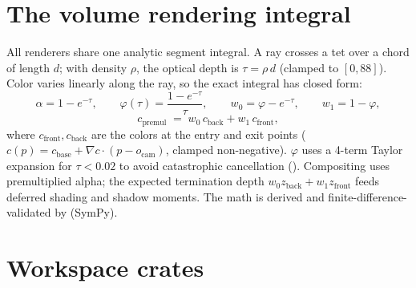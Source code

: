 \section{The volume rendering integral}

All renderers share one analytic segment integral. A ray crosses a tet over a
chord of length $d$; with density $\rho$, the optical depth is
$\tau = \rho\, d$ (clamped to $[0, 88]$). Color varies linearly along the
ray, so the exact integral has closed form:
\[
  \alpha = 1 - e^{-\tau}, \qquad
  \varphi(\tau) = \frac{1 - e^{-\tau}}{\tau}, \qquad
  w_0 = \varphi - e^{-\tau}, \qquad
  w_1 = 1 - \varphi,
\]
\[
  c_{\text{premul}} \;=\; w_0\, c_{\text{back}} + w_1\, c_{\text{front}} ,
\]
where $c_{\text{front}}, c_{\text{back}}$ are the colors at the entry and
exit points ($c(p) = c_{\text{base}} + \nabla c \cdot (p - o_{\text{cam}})$,
clamped non-negative). $\varphi$ uses a 4-term Taylor expansion for
$\tau < 0.02$ to avoid catastrophic cancellation
(). Compositing uses
premultiplied alpha; the expected termination depth
$w_0 z_{\text{back}} + w_1 z_{\text{front}}$ feeds deferred shading and
shadow moments. The math is derived and finite-difference-validated by
 (SymPy).

\section{Workspace crates}


